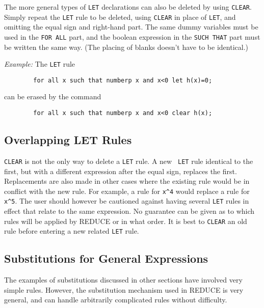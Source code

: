 \documentclass[11pt,letterpaper]{book}
\newcommand{\REDUCE}{REDUCE}
\begin{document}
The more general types of {\tt LET} declarations can also be deleted by
using {\tt CLEAR}.  Simply repeat the {\tt LET} rule to be deleted, using
{\tt CLEAR} in place of {\tt LET}, and omitting the equal sign and
right-hand part.  The same dummy variables must be used in the {\tt FOR
ALL} part, and the boolean expression in the {\tt SUCH THAT} part must be
written the same way. (The placing of blanks doesn't have to be
identical.)

{\it Example:} The {\tt LET} rule
{\small\begin{verbatim}
        for all x such that numberp x and x<0 let h(x)=0;
\end{verbatim}}
can be erased by the command
{\small\begin{verbatim}
        for all x such that numberp x and x<0 clear h(x);
\end{verbatim}}

\subsection{Overlapping LET Rules}
{\tt CLEAR} is not the only way to delete a {\tt LET} rule.  A new {\tt
LET} rule identical to the first, but with a different expression after
the equal sign, replaces the first.  Replacements are also made in other
cases where the existing rule would be in conflict with the new rule.  For
example, a rule for {\tt x\verb|^|4} would replace a rule for {\tt x\verb|^|5}.
The user should however be cautioned against having several {\tt LET}
rules in effect that relate to the same expression.  No guarantee can be
given as to which rules will be applied by {\REDUCE} or in what order.  It
is best to {\tt CLEAR} an old rule before entering a new related {\tt LET}
rule.

\subsection{Substitutions for General Expressions}
\label{sec-gensubs}
The examples of substitutions discussed in other sections have involved
very simple rules. However, the substitution mechanism used in {\REDUCE} is
very general, and can handle arbitrarily complicated rules without
difficulty.
\end{document}
